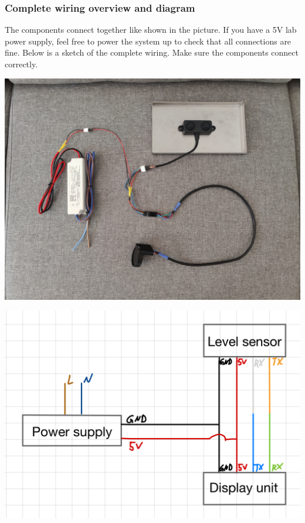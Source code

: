 \documentclass[]{article}
\begin{document}
\subsubsection{Complete wiring overview and diagram}
\begin{minipage}[t]{0.5\linewidth}
	\vspace{0pt}
	The components connect together like shown in the picture. If you have a 5V lab power supply, feel free to power the system up to check that all connections are fine. Below is a sketch of the complete wiring. Make sure the components connect correctly.
\end{minipage}
\hfill
\begin{minipage}[t]{0.4\linewidth}
	\vspace{0pt}
	\includegraphics[width=\linewidth]{images/02_wiring/08_complete_wiring.jpg}
\end{minipage}
\includegraphics[width=\linewidth]{images/02_wiring/09_wiring_diagram.png}
\end{document}

